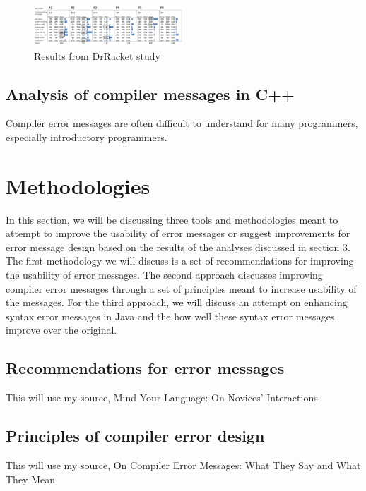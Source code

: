 \documentclass{sig-alternate}
\begin{document}
\begin{figure}[t!]
  \centering
  \includegraphics[keepaspectratio, width=0.5\textwidth]{MEE_Data.png}
  \caption{Results from DrRacket study}
  \label{fig:drracketstudy}
\end{figure}


\subsection{Analysis of compiler messages in C++}
Compiler error messages are often difficult to understand for many programmers, especially introductory programmers. 


\section{Methodologies}
In this section, we will be discussing three tools and methodologies meant to attempt to improve the usability of error messages or suggest improvements for error message design based on the results of the analyses discussed in section 3. The first methodology we will discuss is a set of recommendations for improving the usability of error messages. The second approach discusses improving compiler error messages through a set of principles meant to increase usability of the messages. For the third approach, we will discuss an attempt on enhancing syntax error messages in Java and the how well these syntax error messages improve over the original. 

\subsection{Recommendations for error messages}
This will use my source, Mind Your Language: On Novices' Interactions 

\subsection{Principles of compiler error design}
This will use my source, On Compiler Error Messages: What They Say and What They Mean
\end{document}
